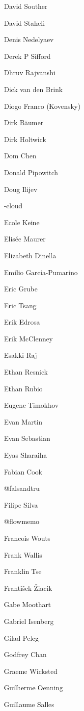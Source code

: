 \begin{DoxyItemize}
\item David Souther
\item David Staheli
\item Denis Nedelyaev
\item Derek P Sifford
\item Dhruv Rajvanshi
\item Dick van den Brink
\item Diogo Franco (Kovensky)
\item Dirk Bäumer
\item Dirk Holtwick
\item Dom Chen
\item Donald Pipowitch
\item Doug Ilijev
\item {\itshape }-\/cloud
\item Ecole Keine
\item Elisée Maurer
\item Elizabeth Dinella
\item Emilio García-\/\+Pumarino
\item Eric Grube
\item Eric Tsang
\item Erik Edrosa
\item Erik Mc\+Clenney
\item Esakki Raj
\item Ethan Resnick
\item Ethan Rubio
\item Eugene Timokhov
\item Evan Martin
\item Evan Sebastian
\item Eyas Sharaiha
\item Fabian Cook
\item @falsandtru
\item Filipe Silva
\item @flowmemo
\item Francois Wouts
\item Frank Wallis
\item Franklin Tse
\item František Žiacik
\item Gabe Moothart
\item Gabriel Isenberg
\item Gilad Peleg
\item Godfrey Chan
\item Graeme Wicksted
\item Guilherme Oenning
\item Guillaume Salles

\end{DoxyItemize}
